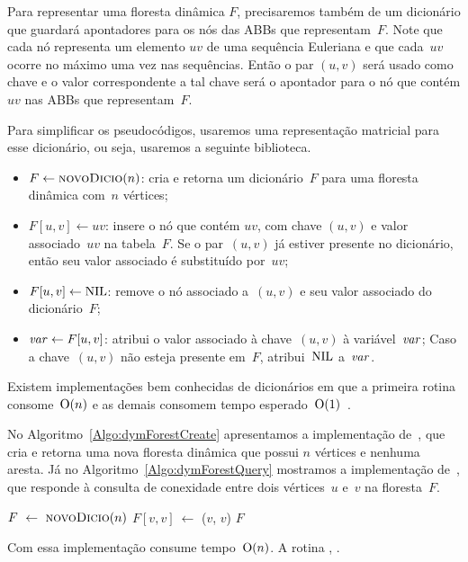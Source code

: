 Para representar uma floresta dinâmica $F$, precisaremos também de um dicionário que guardará apontadores para os nós das ABBs que representam~$F$. Note que cada nó representa um elemento $uv$ de uma sequência Euleriana e que cada~$uv$ ocorre no máximo uma vez nas sequências. Então o par $(u,v)$ será usado como chave e o valor correspondente a tal chave será o apontador para o nó que contém $uv$ nas ABBs que representam~$F$.

Para simplificar os pseudocódigos, usaremos uma representação matricial para esse dicionário, ou seja, usaremos a seguinte biblioteca.
\begin{itemize}
    \item $F \gets \text{\scshape novoDicio}(n)$: cria e retorna um dicionário~$F$ para uma floresta dinâmica com~$n$ vértices;
    \item $F[u,v] \gets uv$: insere o nó que contém $uv$, com chave $(u,v)$ e valor associado~$uv$ na tabela~$F$.
    Se o par~$(u,v)$ já estiver presente no dicionário, então seu valor associado é substituído por~$uv$;
    \item $F[u,v] \gets \text{NIL}{}$: remove o nó associado a~$(u,v)$ e seu valor associado do dicionário~$F$;
    \item $\mathit{var} \gets F[u,v]$: atribui o valor associado à chave~$(u,v)$ à variável~$\mathit{var}$; Caso a chave~$(u,v)$ não esteja presente em~$F$, atribui~$\text{NIL}$ a~$\mathit{var}$.
\end{itemize}
Existem implementações bem conhecidas de dicionários em que a primeira rotina consome~$\mathrm{O}(n)$ e as demais consomem tempo esperado~$\mathrm{O}(1)$~\cite{CLRS}.

No Algoritmo~\ref{Algo:dymForestCreate} apresentamos a implementação de~\dymForestCreate{}, que cria e retorna uma nova floresta dinâmica que possui $n$ vértices e nenhuma aresta.
Já no Algoritmo~\ref{Algo:dymForestQuery} mostramos a implementação de~\dymForestQuery{}, que responde à consulta de conexidade entre dois vértices~$u$ e~$v$ na floresta~$F$.


\begin{algorithm}[htb]
\caption{\dymForestCreate($n$)}
\label{Algo:dymForestCreate}
\begin{algorithmic}[1]
\State $F~\gets~\text{\scshape novoDicio}(n)$
\label{Algo:dymForestCreate:for}
\State $F[v,v]~\gets$ \treapCreate($v$, $v$)
\EndFor
\State \Return $F$
\end{algorithmic}
\end{algorithm}

Com essa implementação \dymForestCreate{} consume tempo~$\mathrm{O}(n)$. A rotina \dymForestQuery{}, .


